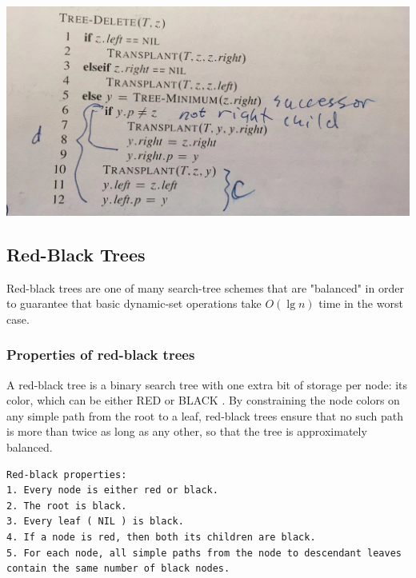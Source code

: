 \documentclass[11pt]{article}
\begin{document}
\includegraphics[width=.9\linewidth]{pics/c12_tree_delete.jpeg} \\


\subsection{Red-Black Trees}
\label{sec-4-4}
Red-black trees are one of many search-tree schemes that are "balanced" in order to guarantee that basic dynamic-set operations take $O(\lg n)$ time in the worst case. \\

\subsubsection{Properties of red-black trees}
\label{sec-4-4-1}

A red-black tree is a binary search tree with one extra bit of storage per node: its color, which can be either RED or BLACK . By constraining the node colors on any simple path from the root to a leaf, red-black trees ensure that no such path is more than twice as long as any other, so that the tree is approximately balanced. \\

\begin{verbatim}
Red-black properties:
1. Every node is either red or black.
2. The root is black.
3. Every leaf ( NIL ) is black.
4. If a node is red, then both its children are black.
5. For each node, all simple paths from the node to descendant leaves contain the same number of black nodes.
\end{verbatim}
\end{document}
